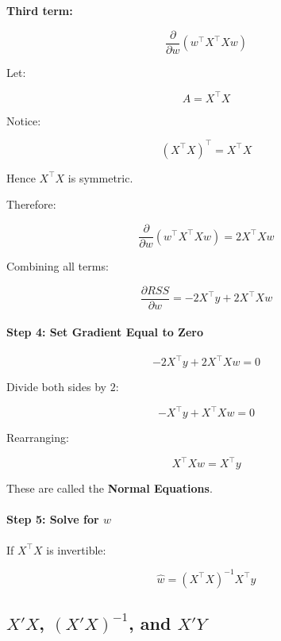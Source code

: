 \documentclass[10pt,a4paper]{article}
\begin{document}
	\vspace{0.5em}
	
	\textbf{Third term:}
	
	\[
	\frac{\partial}{\partial w}
	(w^\top X^\top X w)
	\]
	
	Let:
	
	\[
	A = X^\top X
	\]
	
	Notice:
	
	\[
	(X^\top X)^\top
	=
	X^\top X
	\]
	
	Hence \(X^\top X\) is symmetric.
	
	Therefore:
	
	\[
	\frac{\partial}{\partial w}
	(w^\top X^\top X w)
	=
	2X^\top X w
	\]
	
	Combining all terms:
	
	\[
	\frac{\partial RSS}{\partial w}
	=
	-2X^\top y
	+
	2X^\top X w
	\]
	
	\vspace{0.5em}
	
	\paragraph{Step 4: Set Gradient Equal to Zero}
	
	\[
	-2X^\top y
	+
	2X^\top X w
	=
	0
	\]
	
	Divide both sides by \(2\):
	
	\[
	-X^\top y + X^\top X w = 0
	\]
	
	Rearranging:
	
	\[
	X^\top X w = X^\top y
	\]
	
	These are called the \textbf{Normal Equations}.
	
	\vspace{0.5em}
	
	\paragraph{Step 5: Solve for \(w\)}
	
	If \(X^\top X\) is invertible:
	
	\[
	\boxed{
	\hat{w}
	=
	(X^\top X)^{-1}X^\top y
	}
	\]
	

	\subsection{$X'X$, $(X'X)^{-1}$, and $X'Y$}
\end{document}
